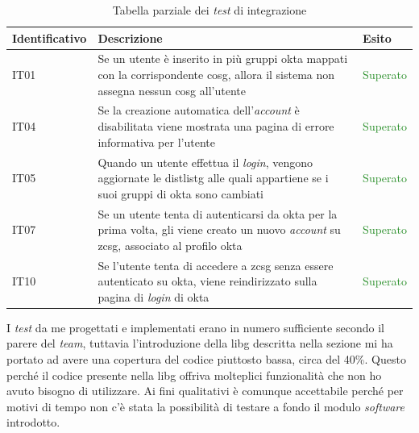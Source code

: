 \begin{center}
    \begin{table}[h]
    \def\arraystretch{1.65}
    \begin{tabular}{|p{3cm}|p{7cm}|p{2cm}|}
        \hline
        \textbf{Identificativo} & \textbf{Descrizione} & \textbf{Esito} \\ \hline  
        IT01 & Se un utente è inserito in più gruppi \gls{okta} mappati con la corrispondente \gls{cosg}, allora il sistema non assegna nessun \gls{cosg} all'utente & \textcolor{ForestGreen}{Superato}\\ \hline
        IT04 & Se la creazione automatica dell'\textit{account} è disabilitata viene mostrata una pagina di errore informativa per l'utente & \textcolor{ForestGreen}{Superato}\\ \hline
        IT05 & Quando un utente effettua il \textit{login}, vengono aggiornate le \gls{distlistg} alle quali appartiene se i suoi gruppi di \gls{okta} sono cambiati & \textcolor{ForestGreen}{Superato}\\ \hline
        IT07 & Se un utente tenta di autenticarsi da \gls{okta} per la prima volta, gli viene creato un nuovo \textit{account} su \gls{zcsg}, associato al profilo \gls{okta} & \textcolor{ForestGreen}{Superato}\\ \hline
        IT10 & Se l'utente tenta di accedere a \gls{zcsg} senza essere autenticato su \gls{okta}, viene reindirizzato sulla pagina di \textit{login} di \gls{okta} & \textcolor{ForestGreen}{Superato}\\ \hline
    \end{tabular}
    \caption{Tabella parziale dei \textit{test} di integrazione}
    \end{table}
\end{center}

I \textit{test} da me progettati e implementati erano in numero sufficiente secondo il parere del \textit{team}, tuttavia l'introduzione della \gls{libg} descritta nella sezione  mi ha portato ad avere una copertura del codice piuttosto bassa, circa del 40\%. Questo perché il codice presente nella \gls{libg} offriva molteplici funzionalità che non ho avuto bisogno di utilizzare. Ai fini qualitativi è comunque accettabile perché per motivi di tempo non c'è stata la possibilità di testare a fondo il modulo \textit{software} introdotto.

